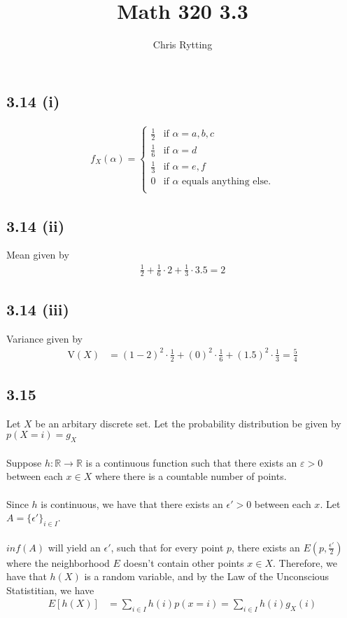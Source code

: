 \documentclass[letterpaper,12pt]{article}
\title{Math 320 3.3}
\author{Chris Rytting}
\theoremstyle{definition}
\begin{document}
\maketitle
\subsection*{3.14 (i)}


\begin{align*}
    f_X(\alpha) = \begin{cases} \frac{1}{2} &\mbox{if } \alpha = a,b,c\\
        \frac{1}{6} & \mbox{if } \alpha = d \\
        \frac{1}{3} & \mbox{if } \alpha = e,f \\
        0 & \mbox{if $\alpha$ equals anything else.}\\
    \end{cases}
\end{align*}

\subsection*{3.14 (ii)}
Mean given by
\begin{align*}
    \frac{1}{2} + \frac{1}{6}\cdot 2 + \frac{1}{3} \cdot 3.5 = 2
\end{align*}

\subsection*{3.14 (iii)}
Variance given by
\begin{align*}
    \text{V}(X) &= (1-2)^2 \cdot \frac{1}{2} + (0)^2 \cdot \frac{1}{6} + (1.5)^2 \cdot \frac{1}{3} = \frac{5}{4}
\end{align*}

\subsection*{3.15}
Let $X$ be an arbitary discrete set. Let the probability distribution be given by $p(X=i) = g_X$
\\\\
Suppose $h:\mathbb{R} \rightarrow \mathbb{R}$ is a continuous function such that there exists an $\varepsilon > 0$ between each $x \in X$ where there is a countable number of points.
\\\\
Since $h$ is continuous, we have that there exists an $\epsilon' >0$ between each $x$. Let $A = \{\epsilon '\}_{i\in I}$.\\\\
$inf(A)$ will yield an $\epsilon'$, such that for every point $p$, there exists an
$E(p,\frac{\epsilon'}{2})$ where the neighborhood $E$ doesn't contain other points $x \in X$. Therefore, we have that $h(X)$ is a random variable, and by the Law of the Unconscious Statistitian, we have
\begin{align*}
    E[h(X)] &= \sum_{i \in I}h(i)p(x = i) = \sum_{i \in I} h(i)g_X(i)
\end{align*}
\end{document}
